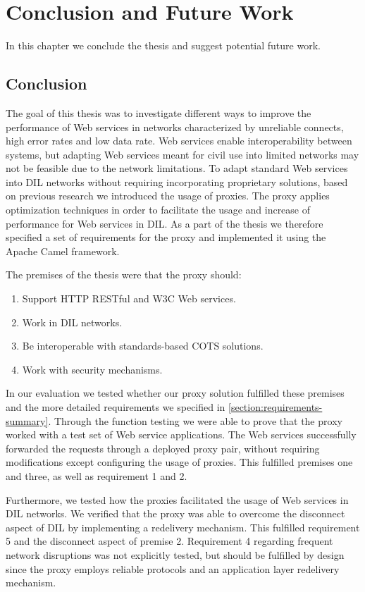 \chapter{Conclusion and Future Work}
\label{chapter:conclusion}

In this chapter we conclude the thesis and suggest potential future work.

\section{Conclusion}

The goal of this thesis was to investigate different ways to improve the
performance of Web services in networks characterized by unreliable connects,
high error rates and low data rate. Web services enable interoperability between
systems, but adapting Web services meant for civil use into limited networks may
not be feasible due to the network limitations. To adapt standard Web services
into DIL networks without requiring incorporating proprietary solutions, based
on previous research we introduced the usage of proxies. The proxy applies
optimization techniques in order to facilitate the usage and increase of
performance for Web services in DIL. As a part of the thesis we therefore
specified a set of requirements for the proxy and implemented it using the
Apache Camel framework.

The premises of the thesis were that the proxy should:

\begin{enumerate}
    \item Support HTTP RESTful and W3C Web services.
    \item Work in DIL networks.
    \item Be interoperable with standards-based COTS solutions.
    \item Work with security mechanisms.
\end{enumerate}

In our evaluation we tested whether our proxy solution fulfilled these premises
and the more detailed requirements we specified in
\cref{section:requirements-summary}. Through the function testing we were able
to prove that the proxy worked with a test set of Web service applications. The
Web services successfully forwarded the requests through a deployed proxy pair,
without requiring modifications except configuring the usage of proxies. This
fulfilled premises one and three, as well as requirement 1 and 2.

Furthermore, we tested how the proxies facilitated the usage of Web services in
DIL networks. We verified that the proxy was able to overcome the disconnect
aspect of DIL by implementing a redelivery mechanism. This fulfilled requirement
5 and the disconnect aspect of premise 2. Requirement 4 regarding frequent
network disruptions was not explicitly tested, but should be fulfilled by design
since the proxy employs reliable protocols and an application layer redelivery
mechanism.

